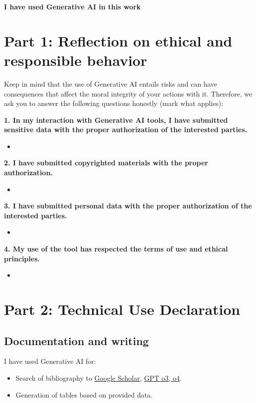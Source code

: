 \textbf{I have used Generative AI in this work} \quad {}

\section*{Part 1: Reflection on ethical and responsible behavior}

Keep in mind that the use of Generative AI entails risks and can have consequences that affect the moral integrity of your actions with it. Therefore, we ask you to answer the following questions honestly (mark what applies):

\textbf{1. In my interaction with Generative AI tools, I have submitted sensitive data with the proper authorization of the interested parties.}
\begin{itemize}
  \item[] 
\end{itemize}

\textbf{2. I have submitted copyrighted materials with the proper authorization.}
\begin{itemize}
  \item[] 
\end{itemize}

\textbf{3. I have submitted personal data with the proper authorization of the interested parties.}
\begin{itemize}
  \item[] 
\end{itemize}

\textbf{4. My use of the tool has respected the terms of use and ethical principles.}
\begin{itemize}
  \item[] 
\end{itemize}


\section*{Part 2: Technical Use Declaration}


\subsection*{Documentation and writing}
I have used Generative AI for:
\begin{itemize}
  \item Search of bibliography to \href{https://www.google.com}{Google Scholar}, \href{https://openai.com}{GPT o3, o4}.
  \item Generation of tables based on provided data.
\end{itemize}

